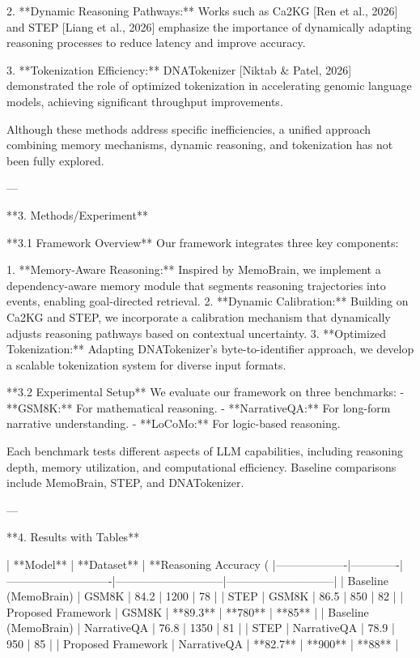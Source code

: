 2. **Dynamic Reasoning Pathways:** Works such as Ca2KG [Ren et al., 2026] and STEP [Liang et al., 2026] emphasize the importance of dynamically adapting reasoning processes to reduce latency and improve accuracy.  

3. **Tokenization Efficiency:** DNATokenizer [Niktab & Patel, 2026] demonstrated the role of optimized tokenization in accelerating genomic language models, achieving significant throughput improvements.  

Although these methods address specific inefficiencies, a unified approach combining memory mechanisms, dynamic reasoning, and tokenization has not been fully explored.

---

**3. Methods/Experiment**  

**3.1 Framework Overview**  
Our framework integrates three key components:  

1. **Memory-Aware Reasoning:** Inspired by MemoBrain, we implement a dependency-aware memory module that segments reasoning trajectories into events, enabling goal-directed retrieval.  
2. **Dynamic Calibration:** Building on Ca2KG and STEP, we incorporate a calibration mechanism that dynamically adjusts reasoning pathways based on contextual uncertainty.  
3. **Optimized Tokenization:** Adapting DNATokenizer’s byte-to-identifier approach, we develop a scalable tokenization system for diverse input formats.  

**3.2 Experimental Setup**  
We evaluate our framework on three benchmarks:  
- **GSM8K:** For mathematical reasoning.  
- **NarrativeQA:** For long-form narrative understanding.  
- **LoCoMo:** For logic-based reasoning.  

Each benchmark tests different aspects of LLM capabilities, including reasoning depth, memory utilization, and computational efficiency. Baseline comparisons include MemoBrain, STEP, and DNATokenizer.

---

**4. Results with Tables**  

| **Model**        | **Dataset** | **Reasoning Accuracy (%
|-------------------|-------------|----------------------------|-----------------------------|-----------------------------|  
| Baseline (MemoBrain) | GSM8K       | 84.2                      | 1200                        | 78                          |  
| STEP              | GSM8K       | 86.5                      | 850                         | 82                          |  
| Proposed Framework | GSM8K       | **89.3**                  | **780**                     | **85**                      |  
| Baseline (MemoBrain) | NarrativeQA | 76.8                      | 1350                        | 81                          |  
| STEP              | NarrativeQA | 78.9                      | 950                         | 85                          |  
| Proposed Framework | NarrativeQA | **82.7**                  | **900**                     | **88**                      |  

